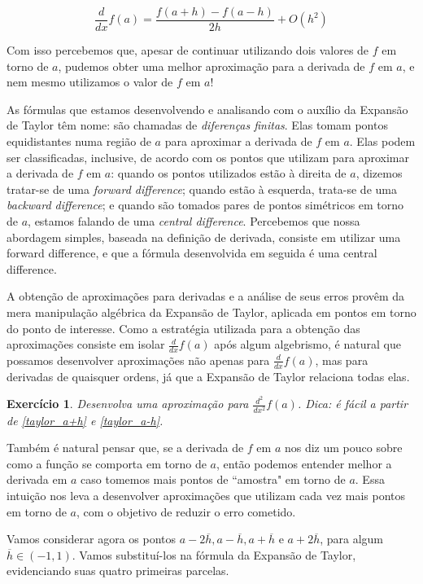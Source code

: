 \documentclass[]{article}
\newtheorem{exercicio}{Exercício}
\numberwithin{equation}{section}
\begin{document}
$$
\frac{d}{dx} f(a) = \frac{f(a + h) - f(a - h)}{2 h} + O(h^2)
$$

Com isso percebemos que, apesar de continuar utilizando dois valores de $f$ em torno de $a$, pudemos obter uma melhor aproximação para a derivada de $f$ em $a$, e nem mesmo utilizamos o valor de $f$ em $a$!

As fórmulas que estamos desenvolvendo e analisando com o auxílio da Expansão de Taylor têm nome: são chamadas de \emph{diferenças finitas}. Elas tomam pontos equidistantes numa região de $a$ para aproximar a derivada de $f$ em $a$. Elas podem ser classificadas, inclusive, de acordo com os pontos que utilizam para aproximar a derivada de $f$ em $a$: quando os pontos utilizados estão à direita de $a$, dizemos tratar-se de uma \emph{forward difference}; quando estão à esquerda, trata-se de uma \emph{backward difference}; e quando são tomados pares de pontos simétricos em torno de $a$, estamos falando de uma \emph{central difference}. Percebemos que nossa abordagem simples, baseada na definição de derivada, consiste em utilizar uma forward difference, e que a fórmula desenvolvida em seguida é uma central difference.

A obtenção de aproximações para derivadas e a análise de seus erros provêm da mera manipulação algébrica da Expansão de Taylor, aplicada em pontos em torno do ponto de interesse. Como a estratégia utilizada para a obtenção das aproximações consiste em isolar $\frac{d}{dx} f(a)$ após algum algebrismo, é natural que possamos desenvolver aproximações não apenas para $\frac{d}{dx} f(a)$, mas para derivadas de quaisquer ordens, já que a Expansão de Taylor relaciona todas elas.

\begin{exercicio}
	Desenvolva uma aproximação para $\frac{d^2}{dx^2} f(a)$. Dica: é fácil a partir de \eqref{taylor_a+h} e \eqref{taylor_a-h}.
\end{exercicio}

Também é natural pensar que, se a derivada de $f$ em $a$ nos diz um pouco sobre como a função se comporta em torno de $a$, então podemos entender melhor a derivada em $a$ caso tomemos mais pontos de ``amostra" em torno de $a$. Essa intuição nos leva a desenvolver aproximações que utilizam cada vez mais pontos em torno de $a$, com o objetivo de reduzir o erro cometido.

Vamos considerar agora os pontos $a - 2\overline{h}, a - \overline{h}, a + \overline{h}$ e $a + 2\overline{h}$, para algum $\overline{h} \in (-1, 1)$. Vamos substituí-los na fórmula da Expansão de Taylor, evidenciando suas quatro primeiras parcelas.
\end{document}
